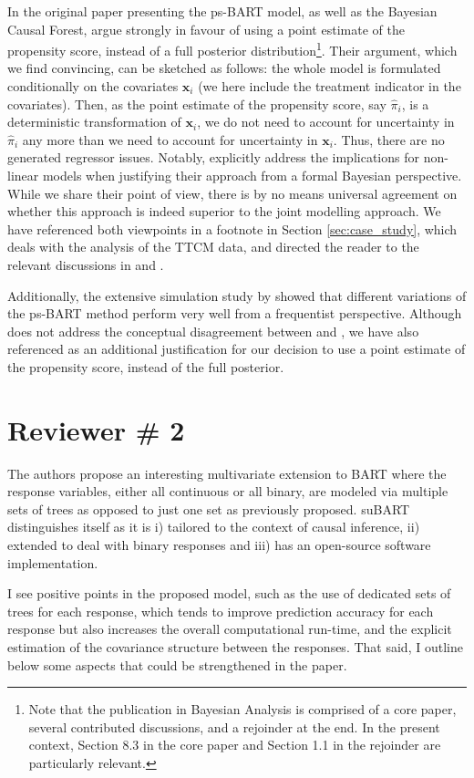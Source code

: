 \documentclass{article}
\begin{document}
In the original paper presenting the ps-BART model, as well as the Bayesian Causal Forest, \citet{hahn2020bayesian} argue strongly in favour of using a point estimate of the propensity score, instead of a full posterior distribution\footnote{Note that the publication in Bayesian Analysis is comprised of a core paper, several contributed discussions, and a rejoinder at the end. In the present context, Section 8.3 in the core paper and Section 1.1 in the rejoinder are particularly relevant.}.  
Their argument, which we find convincing, can be sketched as follows: the whole model is formulated conditionally on the covariates $\mathbf{x}_i$ (we here include the treatment indicator in the covariates). Then, as the point estimate of the propensity score, say $\hat{\pi}_i$, is a deterministic transformation of $\mathbf{x}_i$, we do not need to account for uncertainty in $\hat{\pi}_i$ any more than we need to account for uncertainty in $\mathbf{x}_i$. Thus, there are no generated regressor issues. Notably, \citet{hahn2020bayesian} explicitly address the implications for non-linear models when justifying their approach from a formal Bayesian perspective.  While we share their point of view, there is by no means universal agreement on whether this approach is indeed superior to the joint modelling approach. We have referenced both viewpoints in a footnote in Section \ref{sec:case_study}, which deals with the analysis of the TTCM data, and directed the reader to the relevant discussions in \citet{hahn2020bayesian} and \citet{li2023bayesian}.

Additionally, the extensive simulation study by \citet{dorie2019automated} showed that different variations of the ps-BART method perform very well from a frequentist perspective. Although \citet{dorie2019automated} does not address the conceptual disagreement between \citet{hahn2020bayesian} and \citet{li2023bayesian}, we have also referenced \citet{dorie2019automated} as an additional justification for our decision to use a point estimate of the propensity score, instead of the full posterior.

\section{Reviewer \# 2}

\begin{mdframed}
   The authors propose an interesting multivariate extension to BART where the response variables, either all continuous or all binary, are modeled via multiple sets of trees as opposed to just one set as previously proposed. suBART distinguishes itself as it is i) tailored to the context of causal inference, ii) extended to deal with binary responses and iii) has an open-source software implementation. 
   
   I see positive points in the proposed model, such as the use of dedicated sets of trees for each response, which tends to improve prediction accuracy for each response but also increases the overall computational run-time, and the explicit estimation of the covariance structure between the responses. That said, I outline below some aspects that could be strengthened in the paper.
\end{mdframed}
\end{document}
